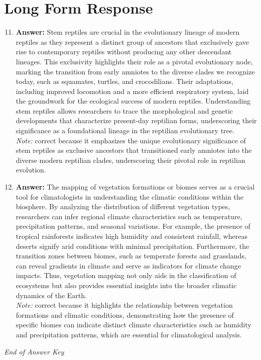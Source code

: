 \documentclass[12pt]{article}
\begin{document}
\section*{Long Form Response}
\begin{enumerate}[label=\arabic*.]
\setcounter{enumi}{10}
\item \textbf{Answer:} Stem reptiles are crucial in the evolutionary lineage of modern reptiles as they represent a distinct group of ancestors that exclusively gave rise to contemporary reptiles without producing any other descendant lineages. This exclusivity highlights their role as a pivotal evolutionary node, marking the transition from early amniotes to the diverse clades we recognize today, such as squamates, turtles, and crocodilians. Their adaptations, including improved locomotion and a more efficient respiratory system, laid the groundwork for the ecological success of modern reptiles. Understanding stem reptiles allows researchers to trace the morphological and genetic developments that characterize present-day reptilian forms, underscoring their significance as a foundational lineage in the reptilian evolutionary tree.
\\ \textit{Note:} correct because it emphasizes the unique evolutionary significance of stem reptiles as exclusive ancestors that transitioned early amniotes into the diverse modern reptilian clades, underscoring their pivotal role in reptilian evolution.
\item \textbf{Answer:} The mapping of vegetation formations or biomes serves as a crucial tool for climatologists in understanding the climatic conditions within the biosphere. By analyzing the distribution of different vegetation types, researchers can infer regional climate characteristics such as temperature, precipitation patterns, and seasonal variations. For example, the presence of tropical rainforests indicates high humidity and consistent rainfall, whereas deserts signify arid conditions with minimal precipitation. Furthermore, the transition zones between biomes, such as temperate forests and grasslands, can reveal gradients in climate and serve as indicators for climate change impacts. Thus, vegetation mapping not only aids in the classification of ecosystems but also provides essential insights into the broader climatic dynamics of the Earth.
\\ \textit{Note:} correct because it highlights the relationship between vegetation formations and climatic conditions, demonstrating how the presence of specific biomes can indicate distinct climate characteristics such as humidity and precipitation patterns, which are essential for climatological analysis.
\end{enumerate}

\vfill
\noindent\textit{End of Answer Key}
\end{document}
